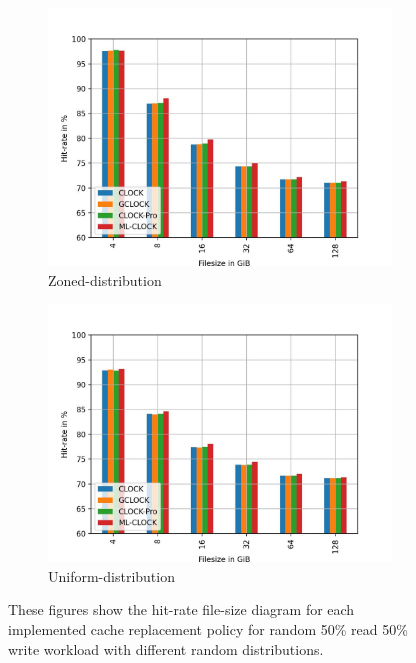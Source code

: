 \documentclass[
	12pt,
	a4paper,
	abstract,
	bibliography=totoc,
	chapterprefix,
	headings=openright,
	numbers=endperiod,
	parskip=half,
	twoside,
]{scrreprt}
\begin{document}
\begin{figure}[H]
\begin{subfigure}{0.4\textwidth}
		\includegraphics[width=\textwidth]{rw_50to50_zoned.jpg}		
		\caption{Zoned-distribution}
		\label{fig:rw_90to10  zoned}
	\end{subfigure}
	\hfill
	\begin{subfigure}{0.4\textwidth}
		\includegraphics[width=\textwidth]{rw_50to50_uniform.jpg}		
		\caption{Uniform-distribution}
		\label{fig:rw_90to10  uniform}
	\end{subfigure}
	\caption{These figures show the hit-rate file-size diagram for each implemented 		cache replacement policy for random 50\% read 50\% write workload with different random distributions.}
\end{figure}

\end{document}

